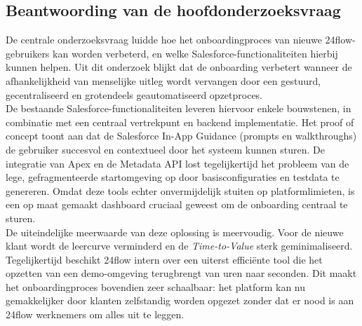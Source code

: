 \subsection{Beantwoording van de hoofdonderzoeksvraag}

De centrale onderzoeksvraag luidde hoe het onboardingproces van nieuwe 24flow-gebruikers kan worden verbeterd, en welke Salesforce-functionaliteiten hierbij kunnen helpen. Uit dit onderzoek blijkt dat de onboarding verbetert wanneer de afhankelijkheid van menselijke uitleg wordt vervangen door een gestuurd, gecentraliseerd en grotendeels geautomatiseerd opzetproces.
\\

De bestaande Salesforce-functionaliteiten leveren hiervoor enkele bouwstenen, in combinatie met een centraal vertrekpunt en backend implementatie. Het proof of concept toont aan dat de Salesforce In-App Guidance (prompts en walkthroughs) de gebruiker succesvol en contextueel door het systeem kunnen sturen. De integratie van Apex en de Metadata API lost tegelijkertijd het probleem van de lege, gefragmenteerde startomgeving op door basisconfiguraties en testdata te genereren. Omdat deze tools echter onvermijdelijk stuiten op platformlimieten, is een op maat gemaakt dashboard cruciaal geweest om de onboarding centraal te sturen.
\\

De uiteindelijke meerwaarde van deze oplossing is meervoudig. Voor de nieuwe klant wordt de leercurve verminderd en de \textit{Time-to-Value} sterk geminimaliseerd. Tegelijkertijd beschikt 24flow intern over een uiterst efficiënte tool die het opzetten van een demo-omgeving terugbrengt van uren naar seconden. Dit maakt het onboardingproces bovendien zeer schaalbaar: het platform kan nu gemakkelijker door klanten zelfstandig worden opgezet zonder dat er nood is aan 24flow werknemers om alles uit te leggen.